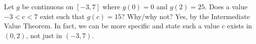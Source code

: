 {Let $g$ be continuous on $[-3,7]$ where $g(0) = 0$ and $g(2) = 25$. Does a value $-3<c<7$ exist such that $g(c) = 15$? Why/why not?
}
{Yes, by the Intermediate Value Theorem. In fact, we can be more specific and state such a value $c$ exists in $(0,2)$, not just in $(-3,7)$.
}
